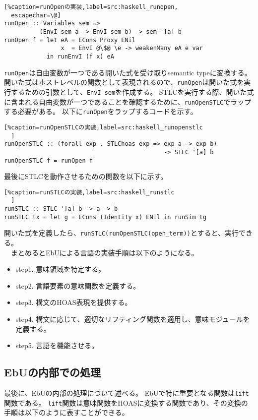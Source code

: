 \documentclass[uplatex]{sumiilab-paper}
\theoremstyle{mystyle}
\numberwithin{definition}{chapter} %
\begin{document}
\begin{lstlisting}[%caption=runOpenの実装,label=src:haskell_runopen,
  escapechar=\@]
runOpen :: Variables sem => 
          (EnvI sem a -> EnvI sem b) -> sem '[a] b
runOpen f = let eA = ECons Proxy ENil
                x  = EnvI @\$@ \e -> weakenMany eA e var
            in runEnvI (f x) eA
\end{lstlisting}

{\tt runOpen}は自由変数が一つである開いた式を受け取りsemantic typeに変換する。
開いた式はホストレベルの関数として表現されるので、{\tt runOpen}は開いた式を実行するための引数として、{\tt EnvI sem}を作成する。
STLCを実行する際、開いた式に含まれる自由変数が一つであることを確認するために、{\tt runOpenSTLC}でラップする必要がある。
以下に{\tt runOpen}をラップするコードを示す。

\begin{lstlisting}[%caption=runOpenSTLCの実装,label=src:haskell_runopenstlc
  ]
runOpenSTLC :: (forall exp . STLChoas exp => exp a -> exp b) 
                                             -> STLC '[a] b
runOpenSTLC f = runOpen f
\end{lstlisting}

最後にSTLCを動作させるための関数を以下に示す。

\begin{lstlisting}[%caption=runSTLCの実装,label=src:haskell_runstlc
  ]
runSTLC :: STLC '[a] b -> a -> b 
runSTLC tx = let g = ECons (Identity x) ENil in runSim tg
\end{lstlisting}

開いた式を定義したら、{\tt runSTLC(runOpenSTLC(open\_term))}とすると、実行できる。\\
　まとめるとEbUによる言語の実装手順は以下のようになる。
\begin{itemize}
  \item step1. 意味領域を特定する。
  \item step2. 言語要素の意味関数を定義する。
  \item step3. 構文のHOAS表現を提供する。
  \item step4. 構文に応じて、適切なリフティング関数を適用し、意味モジュールを定義する。
  \item step5. 言語を機能させる。
\end{itemize}

\subsection{EbUの内部での処理}
最後に、EbUの内部の処理について述べる。
EbUで特に重要となる関数は{\tt lift}関数である。
{\tt lift}関数は意味関数をHOASに変換する関数であり、その変換の手順は以下のように表すことができる。
\end{document}
